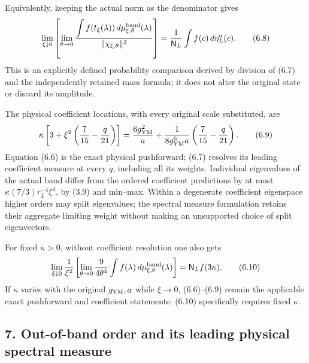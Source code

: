 \documentclass[
  11pt,
]{article}
\begin{document}
Equivalently, keeping the actual norm as the denominator gives \[
 \lim_{\xi\downarrow0}\left[\lim_{\theta\to0}
 \frac{\displaystyle\int f(t_\xi(\lambda))
                     \,d\mu^{\rm band}_{\xi,\theta}(\lambda)}
      {\|\chi_{\xi,\theta}\|^2}\right]
       =\frac1{\mathsf N_L}\int f(c)\,d\eta_L^a(c).
\tag{6.8}
\] This is an explicitly defined probability comparison derived by
division of (6.7) and the independently retained mass formula; it does
not alter the original state or discard its amplitude.

The physical coefficient locations, with every original scale
substituted, are \[
 \kappa\left[3+\xi^2\left(\frac7{15}-\frac q{21}\right)\right]
 =\frac{6g_{\rm YM}^2}{a}
  +\frac1{8g_{\rm YM}^6a}\left(\frac7{15}-\frac q{21}\right).
\tag{6.9}
\] Equation (6.6) is the exact physical pushforward; (6.7) resolves its
leading coefficient measure at every \(q\), including all its weights.
Individual eigenvalues of the actual band differ from the ordered
coefficient predictions by at most \(\kappa(7/3)r_L^{-4}\xi^4\), by
(3.9) and min--max. Within a degenerate coefficient eigenspace higher
orders may split eigenvalues; the spectral measure formulation retains
their aggregate limiting weight without making an unsupported choice of
split eigenvectors.

For fixed \(\kappa>0\), without coefficient resolution one also gets \[
 \lim_{\xi\downarrow0}\frac1{\xi^2}
 \left[\lim_{\theta\to0}\frac9{4\theta^4}
            \int f(\lambda)\,d\mu^{\rm band}_{\xi,\theta}(\lambda)\right]
 =\mathsf N_L f(3\kappa).
\tag{6.10}
\] If \(\kappa\) varies with the original \(g_{\rm YM},a\) while
\(\xi\to0\), (6.6)--(6.9) remain the applicable exact pushforward and
coefficient statements; (6.10) specifically requires fixed \(\kappa\).

\subsection{7. Out-of-band order and its leading physical spectral
measure}\label{magnetic-part-9-out-of-band-order-and-its-leading-physical-spectral-measure}
\end{document}
